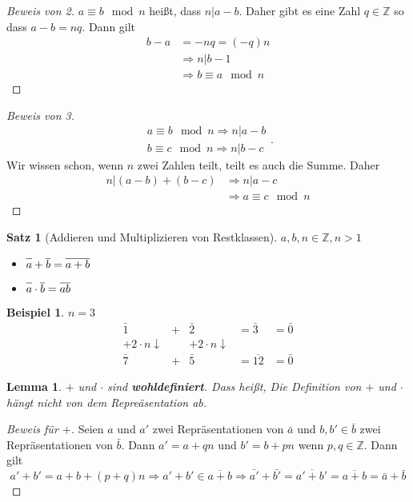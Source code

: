 \documentclass{article}
\theoremstyle{definition}
\newtheorem*{bei*}{Beispiel}
\theoremstyle{plain}
\newtheorem{sa}[definition]{Satz}
\newtheorem{lem}[definition]{Lemma}
\begin{document}
\begin{proof}[Beweis von 2] 
	$ a \equiv b \mod n $ hei\ss t, dass $ n | a-b $. Daher gibt es eine Zahl $ q \in \mathbb{Z} $ so dass $ a - b = nq $. Dann gilt
	\begin{align*}
		b - a & = -nq = (-q)n \\
		& \Rightarrow n | b-1 \\
		& \Rightarrow \boxed{b \equiv a \mod n}
	\end{align*}
\end{proof}
\begin{proof}[Beweis von 3]
	\[ 
	\begin{array}{ll}
		a \equiv b \mod n \Rightarrow n | a-b \\
		b \equiv c \mod n \Rightarrow n | b-c
	\end{array}.
	 \]
	 Wir wissen schon, wenn $ n $ zwei Zahlen teilt, teilt es auch die Summe. Daher
	 \begin{align*}
	 	n | (a-b) + (b-c) & \Rightarrow n | a-c \\
	 	& \Rightarrow a \equiv c \mod n
	 \end{align*}
\end{proof}
\begin{sa}[Addieren und Multiplizieren von Restklassen]
	$ a,b,n \in \mathbb{Z}, n>1 $
	\begin{itemize}
		\item $ \overline{\vphantom{b}a} + \overline{b} = \overline{a+b} $
		\item $ \overline{\vphantom{b}a} \cdot \overline{b} = \overline{ab} $
	\end{itemize}
\end{sa}
\begin{bei*}
	$ n=3 $
	\[ 
	\begin{array}{rlrll}
		\bar{1} & + & \bar{2} & = \bar{3} & = \bar{0} \\
		+ 2 \cdot n\downarrow & & + 2 \cdot n \downarrow & & \\
		\bar{7} & + & \bar{5} & = \overline{12} & = \bar{0} 
	\end{array}
	 \]
\end{bei*}
\begin{lem}
	$ + $ und $ \cdot $ sind \textbf{wohldefiniert}. Dass hei\ss t, Die Definition von $ + $ und $ \cdot $ h\"angt nicht von dem Repre\"asentation ab.
\end{lem}
\begin{proof}[Beweis f\"ur $ + $]
	Seien $ a $ und $ a' $ zwei Repr\"asentationen von $ \bar{a} $ und $ b,b' \in \bar{b} $ zwei Repr\"asentationen von $ \bar{b} $. Dann $ a' = a + qn $ und $ b' = b + pn $ wenn $ p,q \in \mathbb{Z} $. Dann gilt
	\[ 
	a' + b' = a + b + (p+q)n \Rightarrow a'+b' \in \overline{a+b} \Rightarrow \bar{a'} + \bar{b'} = \overline{a'+b'}
	= \overline{a+b} = \bar{a} + \bar{b}
	 \]
\end{proof}
\end{document}
